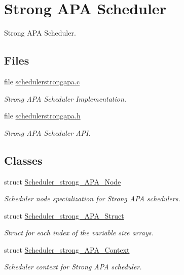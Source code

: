 \hypertarget{group__RTEMSScoreSchedulerStrongAPA}{}\section{Strong A\+PA Scheduler}
\label{group__RTEMSScoreSchedulerStrongAPA}


Strong A\+PA Scheduler.  


\subsection*{Files}
\begin{DoxyCompactItemize}
\item 
file \hyperlink{schedulerstrongapa_8c}{schedulerstrongapa.\+c}
\begin{DoxyCompactList}\small\item\em Strong A\+PA Scheduler Implementation. \end{DoxyCompactList}\item 
file \hyperlink{schedulerstrongapa_8h}{schedulerstrongapa.\+h}
\begin{DoxyCompactList}\small\item\em Strong A\+PA Scheduler A\+PI. \end{DoxyCompactList}\end{DoxyCompactItemize}
\subsection*{Classes}
\begin{DoxyCompactItemize}
\item 
struct \hyperlink{structScheduler__strong__APA__Node}{Scheduler\+\_\+strong\+\_\+\+A\+P\+A\+\_\+\+Node}
\begin{DoxyCompactList}\small\item\em Scheduler node specialization for Strong A\+PA schedulers. \end{DoxyCompactList}\item 
struct \hyperlink{structScheduler__strong__APA__Struct}{Scheduler\+\_\+strong\+\_\+\+A\+P\+A\+\_\+\+Struct}
\begin{DoxyCompactList}\small\item\em Struct for each index of the variable size arrays. \end{DoxyCompactList}\item 
struct \hyperlink{structScheduler__strong__APA__Context}{Scheduler\+\_\+strong\+\_\+\+A\+P\+A\+\_\+\+Context}
\begin{DoxyCompactList}\small\item\em Scheduler context for Strong A\+PA scheduler. \end{DoxyCompactList}\end{DoxyCompactItemize}
